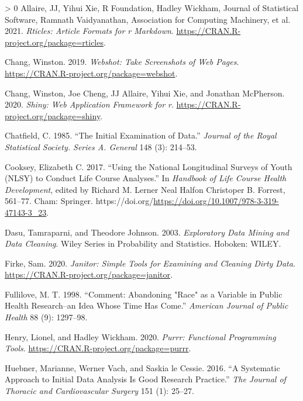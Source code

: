 \documentclass{article}
\newlength{\cslhangindent}
\newenvironment{CSLReferences}[3] %
 {%
  \setlength{\parindent}{0pt}
  \ifodd #1 \everypar{\setlength{\hangindent}{\cslhangindent}}\ignorespaces\fi
  \ifnum #2 > 0
  \setlength{\parskip}{#2\baselineskip}
  \fi
 }%
 {}
\begin{document}
\hypertarget{refs}{}
\begin{CSLReferences}{1}{0}
\leavevmode\hypertarget{ref-rticles}{}%
Allaire, JJ, Yihui Xie, R Foundation, Hadley Wickham, Journal of Statistical Software, Ramnath Vaidyanathan, Association for Computing Machinery, et al. 2021. \emph{Rticles: Article Formats for r Markdown}. \url{https://CRAN.R-project.org/package=rticles}.

\leavevmode\hypertarget{ref-webshot}{}%
Chang, Winston. 2019. \emph{Webshot: Take Screenshots of Web Pages}. \url{https://CRAN.R-project.org/package=webshot}.

\leavevmode\hypertarget{ref-shiny}{}%
Chang, Winston, Joe Cheng, JJ Allaire, Yihui Xie, and Jonathan McPherson. 2020. \emph{Shiny: Web Application Framework for r}. \url{https://CRAN.R-project.org/package=shiny}.

\leavevmode\hypertarget{ref-Chatfield1985TIEo}{}%
Chatfield, C. 1985. {``The Initial Examination of Data.''} \emph{Journal of the Royal Statistical Society. Series A. General} 148 (3): 214--53.

\leavevmode\hypertarget{ref-eliznlsy}{}%
Cooksey, Elizabeth C. 2017. {``Using the National Longitudinal Surveys of Youth (NLSY) to Conduct Life Course Analyses.''} In \emph{Handbook of Life Course Health Development}, edited by Richard M. Lerner Neal Halfon Christoper B. Forrest, 561--77. Cham: Springer. https://doi.org/\url{https://doi.org/10.1007/978-3-319-47143-3_23}.

\leavevmode\hypertarget{ref-DasuTamraparni2003Edma}{}%
Dasu, Tamraparni, and Theodore Johnson. 2003. \emph{Exploratory Data Mining and Data Cleaning}. Wiley Series in Probability and Statistics. Hoboken: WILEY.

\leavevmode\hypertarget{ref-janitor}{}%
Firke, Sam. 2020. \emph{Janitor: Simple Tools for Examining and Cleaning Dirty Data}. \url{https://CRAN.R-project.org/package=janitor}.

\leavevmode\hypertarget{ref-racismnotrace}{}%
Fullilove, M. T. 1998. {``Comment: Abandoning "Race" as a Variable in Public Health Research--an Idea Whose Time Has Come.''} \emph{American Journal of Public Health} 88 (9): 1297--98.

\leavevmode\hypertarget{ref-purrr}{}%
Henry, Lionel, and Hadley Wickham. 2020. \emph{Purrr: Functional Programming Tools}. \url{https://CRAN.R-project.org/package=purrr}.

\leavevmode\hypertarget{ref-HuebnerMariannePhD2016Asat}{}%
Huebner, Marianne, Werner Vach, and Saskia le Cessie. 2016. {``A Systematic Approach to Initial Data Analysis Is Good Research Practice.''} \emph{The Journal of Thoracic and Cardiovascular Surgery} 151 (1): 25--27.


\end{CSLReferences}
\end{document}
